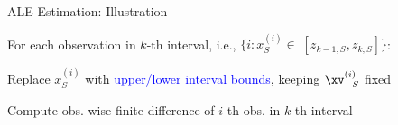 \documentclass[10pt,compress,t,notes=noshow, xcolor=table]{beamer}
\begin{document}
\begin{framev}[align=top]{ALE Estimation: Illustration}
\begin{itemizeM}
\item<1-> For each observation in $k$-th interval, i.e., $\{i: x_S^{(i)} \in \; [z_{k-1, S}, z_{k, S}]\}$:
\begin{itemizeS}
\item Replace $x_S^{(i)}$ with \textcolor{blue}{upper/lower interval bounds}, keeping $\xv_{-S}^{(i)}$ fixed
\item Compute obs.-wise finite difference of $i$-th obs. in $k$-th interval \\

\end{itemizeS}
\end{itemizeM}
\end{framev}
\end{document}
